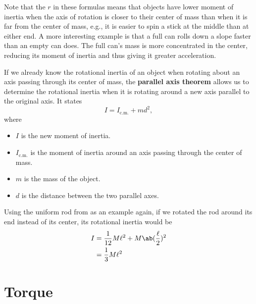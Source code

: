 Note that the \(r\) in these formulas means that objects have lower
moment of inertia
when the axis of rotation is closer to their center of mass
than when it is far from the center of mass,
e.g., it is easier to spin a stick at the middle than at either end.
A more interesting example is that a full can rolls down a slope
faster than an empty can does.
The full can's mass is more concentrated in the center,
reducing its moment of inertia and thus giving it greater acceleration.

If we already know the rotational inertia of an object
when rotating about an axis passing through its center of mass,
the \textbf{parallel axis theorem} allows us to determine the rotational inertia
when it is rotating around a new axis parallel to the original axis.
It states
\begin{equation}
    I = I_\mathrm{c.m.} + m d^2,
\end{equation}
where
\begin{itemize}
    \item \(I\) is the new moment of inertia.
    \item \(I_\mathrm{c.m.}\) is the moment of inertia
        around an axis passing through the center of mass.
    \item \(m\) is the mass of the object.
    \item \(d\) is the distance between the two parallel axes.
\end{itemize}

Using the uniform rod from 
as an example again,
if we rotated the rod around its end instead of its center, its
rotational inertia would be
\begin{equation}
    \begin{aligned}
        I &= \frac{1}{12} M \ell^2 + M \ab(\frac{\ell}{2})^2 \\
        &= \frac{1}{3} M \ell^2
    \end{aligned}
\end{equation}

\begin{figure}[ht]
    \centering
    
\end{figure}

\section{Torque}

